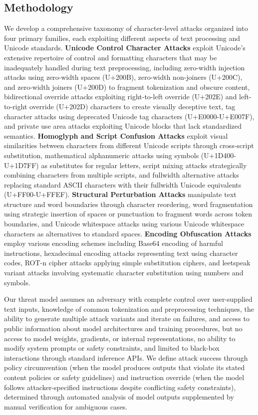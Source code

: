 \documentclass[11pt]{article}
\begin{document}
\begin{multicols}{2}
\section{Methodology}

We develop a comprehensive taxonomy of character-level attacks organized into four primary families, each exploiting different aspects of text processing and Unicode standards. \textbf{Unicode Control Character Attacks} exploit Unicode's extensive repertoire of control and formatting characters that may be inadequately handled during text preprocessing, including zero-width injection attacks using zero-width spaces (U+200B), zero-width non-joiners (U+200C), and zero-width joiners (U+200D) to fragment tokenization and obscure content, bidirectional override attacks exploiting right-to-left override (U+202E) and left-to-right override (U+202D) characters to create visually deceptive text, tag character attacks using deprecated Unicode tag characters (U+E0000-U+E007F), and private use area attacks exploiting Unicode blocks that lack standardized semantics. \textbf{Homoglyph and Script Confusion Attacks} exploit visual similarities between characters from different Unicode scripts through cross-script substitution, mathematical alphanumeric attacks using symbols (U+1D400-U+1D7FF) as substitutes for regular letters, script mixing attacks strategically combining characters from multiple scripts, and fullwidth alternative attacks replacing standard ASCII characters with their fullwidth Unicode equivalents (U+FF00-U+FFEF). \textbf{Structural Perturbation Attacks} manipulate text structure and word boundaries through character reordering, word fragmentation using strategic insertion of spaces or punctuation to fragment words across token boundaries, and Unicode whitespace attacks using various Unicode whitespace characters as alternatives to standard spaces. \textbf{Encoding Obfuscation Attacks} employ various encoding schemes including Base64 encoding of harmful instructions, hexadecimal encoding attacks representing text using character codes, ROT-n cipher attacks applying simple substitution ciphers, and leetspeak variant attacks involving systematic character substitution using numbers and symbols.

Our threat model assumes an adversary with complete control over user-supplied text inputs, knowledge of common tokenization and preprocessing techniques, the ability to generate multiple attack variants and iterate on failures, and access to public information about model architectures and training procedures, but no access to model weights, gradients, or internal representations, no ability to modify system prompts or safety constraints, and limited to black-box interactions through standard inference APIs. We define attack success through policy circumvention (when the model produces outputs that violate its stated content policies or safety guidelines) and instruction override (when the model follows attacker-specified instructions despite conflicting safety constraints), determined through automated analysis of model outputs supplemented by manual verification for ambiguous cases.


\end{multicols}
\end{document}
